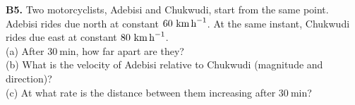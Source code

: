 \begin{exercisebox}[3]
\vspace{0.4cm}

\textbf{B5.} Two motorcyclists, Adebisi and Chukwudi,
start from the same point. Adebisi rides due north at
constant $60\ \text{km\,h}^{-1}$. At the same instant,
Chukwudi rides due east at constant $80\ \text{km\,h}^{-1}$.\\[4pt]
(a) After $30\ \text{min}$, how far apart are they?\\
(b) What is the velocity of Adebisi relative to Chukwudi
(magnitude and direction)?\\
(c) At what rate is the distance between them increasing
after $30\ \text{min}$?
\hfill{}

\end{exercisebox}
